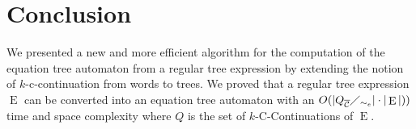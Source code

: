 \documentclass{llncs}
\DeclareMathOperator{\E}{E}
\def\b#1{\overline{#1}}
\begin{document}
\section{Conclusion}

We presented a new and more efficient algorithm for the computation of the equation tree automaton from a regular tree expression by extending the notion of $k$-c-continuation from words to trees. We proved that a regular tree expression $\E$ can be converted into an equation tree automaton with an $O(|Q_{\b{\cal C}}\diagup_{\sim_e}|\cdot|\E|))$ time and space complexity 
where $Q$ is the set of $k$-C-Continuations of $\E$.



\end{document}
